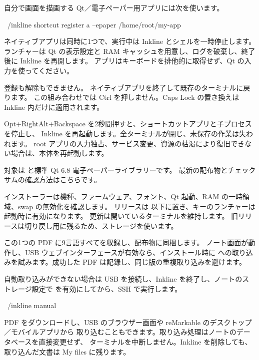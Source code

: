 自分で画面を描画する Qt／電子ペーパー用アプリには次を使います。
\begin{shell}
~/inkline shortcut register a --epaper /home/root/my-app
\end{shell}
ネイティブアプリは同時に1つで、実行中は Inkline とシェルを一時停止します。
ランチャーは Qt の表示設定と RAM キャッシュを用意し、ログを破棄し、終了後に Inkline を再開します。
アプリはキーボードを排他的に取得せず、Qt の入力を使ってください。

\begin{notice}
 登録も解除もできません。
ネイティブアプリを終了して既存のターミナルに戻ります。
この組み合わせでは Ctrl を押しません。Caps Lock の置き換えは Inkline 内だけに適用されます。
\end{notice}

 Opt+RightAlt+Backspace を2秒間押すと、ショートカットアプリと子プロセスを停止し、
Inkline を再起動します。全ターミナルが閉じ、未保存の作業は失われます。
root アプリの入力独占、サービス変更、資源の枯渇により復旧できない場合は、本体を再起動します。

対象は  と標準 Qt 6.8 電子ペーパーライブラリーです。
最新の配布物とチェックサムの確認方法はこちらです。

\InstallLink

インストーラーは機種、ファームウェア、フォント、Qt 起動、RAM の一時領域、swap の無効化を確認します。
リリースは  以下に置き、キーのランチャーは起動時に有効になります。
更新は開いているターミナルを維持します。
旧リリースは切り戻し用に残るため、ストレージを使います。

この1つの PDF に9言語すべてを収録し、配布物に同梱します。
ノート画面が動作し、USB ウェブインターフェースが有効なら、インストール時に
 への取り込みを試みます。成功した PDF は記録し、同じ版の重複取り込みを避けます。

自動取り込みができない場合は USB を接続し、Inkline を終了し、ノートのストレージ設定で
 を有効にしてから、SSH で実行します。
\begin{shell}
~/inkline manual
\end{shell}
PDF をダウンロードし、USB のブラウザー画面や reMarkable のデスクトップ／モバイルアプリから
取り込むこともできます。取り込み処理はノートのデータベースを直接変更せず、
ターミナルを中断しません。Inkline を削除しても、取り込んだ文書は My files に残ります。

